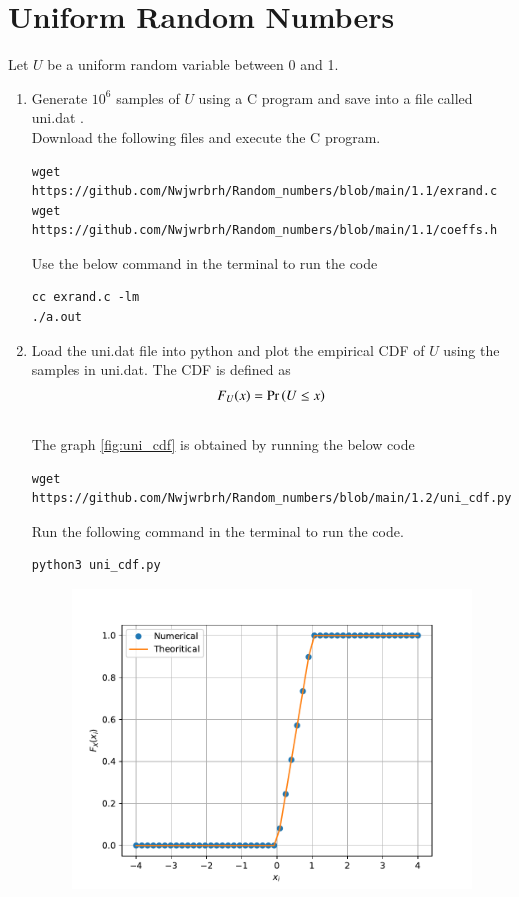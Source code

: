 \documentclass[journal,12pt,twocolumn]{IEEEtran}
\renewcommand\thesection{\arabic{section}}
\begin{document}
\section{Uniform Random Numbers}
Let $U$ be a uniform random variable between 0 and 1.
\begin{enumerate}[label=\thesection.\arabic*
,ref=\thesection.\theenumi]
\item Generate $10^6$ samples of $U$ using a C program and save into a file called uni.dat .
\\
\solution Download the following files and execute the  C program.
\begin{lstlisting}
wget https://github.com/Nwjwrbrh/Random_numbers/blob/main/1.1/exrand.c
wget https://github.com/Nwjwrbrh/Random_numbers/blob/main/1.1/coeffs.h
\end{lstlisting}
Use the below command in the terminal to run the code
\begin{lstlisting}
cc exrand.c -lm
./a.out
\end{lstlisting}
\item Load the uni.dat file into python and plot the empirical CDF of $U$ using the samples in uni.dat. The CDF is defined as
\begin{align}
F_{U}(x) = \Pr\left(U \le x\right)
\end{align}
\\
\solution 
The graph \ref{fig:uni_cdf} is obtained by running the below code
\begin{lstlisting}
wget https://github.com/Nwjwrbrh/Random_numbers/blob/main/1.2/uni_cdf.py
\end{lstlisting}
Run the following command in the terminal to run the code.\\
\begin{lstlisting}
python3 uni_cdf.py
\end{lstlisting}
\begin{figure}[h]
\centering
\includegraphics[width=\columnwidth]{../1.2/uni_cdf}

\end{figure}
\end{enumerate}
\end{document}
